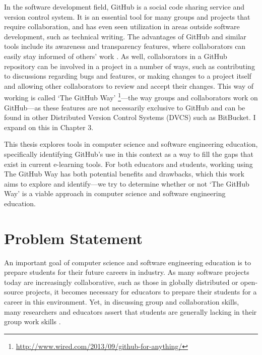 In the software development field, GitHub is a social code sharing service and version control system. It is an essential tool for many groups and projects that require collaboration, and has even seen utilization in areas outside software development, such as technical writing. The advantages of GitHub and similar tools include its awareness and transparency features, where collaborators can easily stay informed of others' work \cite{dabbish2012social}. As well, collaborators in a GitHub repository can be involved in a project in a number of ways, such as contributing to discussions regarding bugs and features, or making changes to a project itself and allowing other collaborators to review and accept their changes. This way of working is called `The GitHub Way' \footnote{\url{http://www.wired.com/2013/09/github-for-anything/}}---the way groups and collaborators work on GitHub---as these features are not necessarily exclusive to GitHub and can be found in other Distributed Version Control Systems (DVCS) such as BitBucket. I expand on this in Chapter 3.

This thesis explores tools in computer science and software engineering education, specifically identifying GitHub's use in this context as a way to fill the gaps that exist in current e-learning tools. For both educators and students, working using The GitHub Way has both potential benefits and drawbacks, which this work aims to explore and identify---we try to determine whether or not `The GitHub Way' is a viable approach in computer science and software engineering education.

\section{Problem Statement}
An important goal of computer science and software engineering education is to prepare students for their future careers in industry. As many software projects today are increasingly collaborative, such as those in globally distributed or open-source projects, it becomes necessary for educators to prepare their students for a career in this environment. Yet, in discussing group and collaboration skills, many researchers and educators assert that students are generally lacking in their group work skills \cite{waite2004student}.

